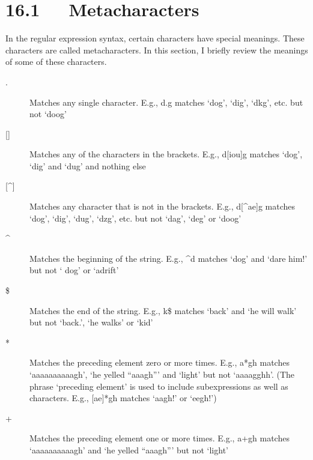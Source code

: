 \documentclass[letterpaper,10pt,english]{sphinxmanual}
\begin{document}
\section{16.1   Metacharacters}
\label{documentation:metacharacters}
In the regular expression syntax, certain characters have special meanings.
These characters are called metacharacters.  In this section, I briefly review
the meanings of some of these characters.
\begin{description}
\item[{.}] \leavevmode
Matches any single character.  E.g., d.g matches `dog', `dig', `dkg', etc.
but not `doog'

\item[{{[}{]}}] \leavevmode
Matches any of the characters in the brackets.  E.g., d{[}iou{]}g matches `dog',
`dig' and `dug' and nothing else

\item[{{[}\textasciicircum{}{]}}] \leavevmode
Matches any character that is not in the brackets.  E.g., d{[}\textasciicircum{}ae{]}g matches
`dog', `dig', `dug', `dzg', etc. but not `dag', `deg' or `doog'

\end{description}
\begin{description}
\item[{\textasciicircum{}}] \leavevmode
Matches the beginning of the string.  E.g., \textasciicircum{}d matches `dog' and `dare him!'
but not ` dog' or `adrift'

\end{description}
\begin{description}
\item[{\$}] \leavevmode
Matches the end of the string.  E.g., k\$ matches `back' and `he will walk'
but not `back.', `he walks' or `kid'

\item[{*}] \leavevmode
Matches the preceding element zero or more times.  E.g., a*gh matches
`aaaaaaaaaagh', `he yelled ``aaagh''' and `light' but not `aaaagghh'.  (The
phrase `preceding element' is used to include subexpressions as well as
characters.  E.g., {[}ae{]}*gh matches `aagh!' or `eegh!')

\item[{+}] \leavevmode
Matches the preceding element one or more times.  E.g., a+gh matches
`aaaaaaaaaagh' and `he yelled ``aaagh''' but not `light'

\end{description}
\end{document}
